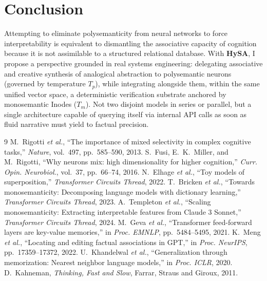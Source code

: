 \documentclass[10pt,twocolumn]{article}
\theoremstyle{definition}
\begin{document}
\section{Conclusion}
Attempting to eliminate polysemanticity from neural networks to force interpretability is equivalent to dismantling the associative capacity of cognition because it is not assimilable to a structured relational database. With \textbf{HySA}, I propose a perspective grounded in real systems engineering: delegating associative and creative synthesis of analogical abstraction to polysemantic neurons (governed by temperature $T_p$), while integrating alongside them, within the same unified vector space, a deterministic verification substrate anchored by monosemantic Inodes ($T_m$). Not two disjoint models in series or parallel, but a single architecture capable of querying itself via internal API calls as soon as fluid narrative must yield to factual precision.

\begin{thebibliography}{9}
\scriptsize
\setlength{\itemsep}{0.2pt}
\setlength{\parskip}{0pt}
 M.~Rigotti \textit{et al.}, ``The importance of mixed selectivity in complex cognitive tasks,'' \textit{Nature}, vol.~497, pp.~585--590, 2013.
 S.~Fusi, E.~K.~Miller, and M.~Rigotti, ``Why neurons mix: high dimensionality for higher cognition,'' \textit{Curr. Opin. Neurobiol.}, vol.~37, pp.~66--74, 2016.
 N.~Elhage \textit{et al.}, ``Toy models of superposition,'' \textit{Transformer Circuits Thread}, 2022.
 T.~Bricken \textit{et al.}, ``Towards monosemanticity: Decomposing language models with dictionary learning,'' \textit{Transformer Circuits Thread}, 2023.
 A.~Templeton \textit{et al.}, ``Scaling monosemanticity: Extracting interpretable features from Claude 3 Sonnet,'' \textit{Transformer Circuits Thread}, 2024.
 M.~Geva \textit{et al.}, ``Transformer feed-forward layers are key-value memories,'' in \textit{Proc. EMNLP}, pp.~5484--5495, 2021.
 K.~Meng \textit{et al.}, ``Locating and editing factual associations in GPT,'' in \textit{Proc. NeurIPS}, pp.~17359--17372, 2022.
 U.~Khandelwal \textit{et al.}, ``Generalization through memorization: Nearest neighbor language models,'' in \textit{Proc. ICLR}, 2020.
 D.~Kahneman, \textit{Thinking, Fast and Slow}, Farrar, Straus and Giroux, 2011.
\end{thebibliography}
\end{document}

